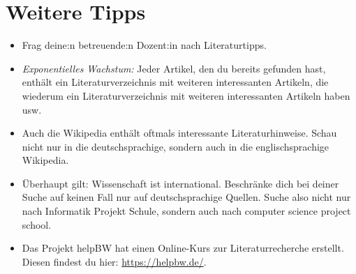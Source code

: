 \documentclass{../cssheet}
\begin{document}
\section{Weitere Tipps}
\begin{itemize}
\item Frag deine:n betreuende:n Dozent:in nach Literaturtipps.
\item \emph{Exponentielles Wachstum:} Jeder Artikel, den du bereits gefunden hast, enthält ein Literaturverzeichnis mit weiteren interessanten Artikeln, die wiederum ein Literaturverzeichnis mit weiteren interessanten Artikeln haben usw.
\item Auch die Wikipedia enthält oftmals interessante Literaturhinweise. Schau nicht nur in die deutschsprachige, sondern auch in die englischsprachige Wikipedia.
\item Überhaupt gilt: Wissenschaft ist international. Beschränke dich bei deiner Suche auf keinen Fall nur auf deutschsprachige Quellen. Suche also nicht nur nach \glqq{}Informatik Projekt Schule\grqq{}, sondern auch nach \glqq{}computer science project school\grqq{}.
\item Das Projekt helpBW hat einen Online-Kurs zur Literaturrecherche erstellt. Diesen findest du hier: \url{https://helpbw.de/}.

\end{itemize}

\newpage

\printlicense

\printsocials
\end{document}
